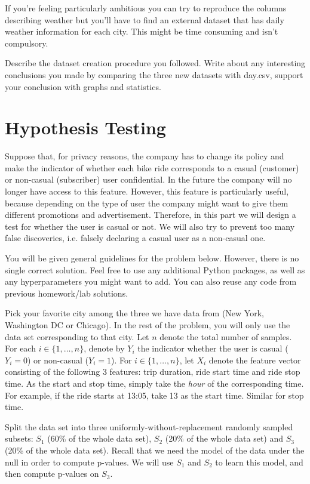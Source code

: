 \documentclass[12pt, answers, addpoints]{exam}
\begin{document}
If you're feeling particularly ambitious you can try to reproduce the columns describing weather but you'll have to find an external dataset that has daily weather information for each city. This might be time consuming and isn't compulsory.

Describe the dataset creation procedure you followed. Write about any interesting conclusions you made by comparing the three new datasets with day.csv, support your conclusion with graphs and statistics.



\section{Hypothesis Testing}


Suppose that, for privacy reasons, the company has to change its policy and make the indicator of whether each bike ride corresponds to a casual (customer) or non-casual (subscriber) user confidential. In the future the company will no longer have access to this feature. However, this feature is particularly useful, because depending on the type of user the company might want to give them different promotions and advertisement. Therefore, in this part we will design a test for whether the user is casual or not. We will also try to prevent too many false discoveries, i.e. falsely declaring a casual user as a non-casual one.


You will be given general guidelines for the problem below. However, there is no single correct solution. Feel free to use any additional Python packages, as well as any hyperparameters you might want to add. You can also reuse any code from previous homework/lab solutions.

Pick your favorite city among the three we have data from (New York, Washington DC or Chicago). In the rest of the problem, you will only use the data set corresponding to that city. Let $n$ denote the total number of samples. For each $i\in\{1,\dots,n\}$, denote by $Y_i$ the indicator whether the user is casual ($Y_i=0$) or non-casual ($Y_i=1$). For $i\in\{1,\dots,n\}$, let $X_i$ denote the feature vector consisting of the following 3 features: trip duration, ride start time and ride stop time. As the start and stop time, simply take the \emph{hour} of the corresponding time. For example, if the ride starts at 13:05, take 13 as the start time. Similar for stop time.

Split the data set into three uniformly-without-replacement randomly sampled subsets: $S_1$ (60\% of the whole data set), $S_2$ (20\% of the whole data set) and $S_3$ (20\% of the whole data set). Recall that we need the model of the data under the null in order to compute p-values. We will use $S_1$ and $S_2$ to learn this model, and then compute p-values on $S_3$. 
\end{document}
